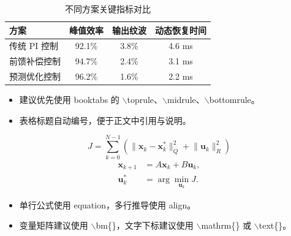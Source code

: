 \documentclass[10pt,aspectratio=169]{beamer}
\begin{document}
\begin{frame}
\begin{HUSTContentFrame}
\begin{HUSTTableBlock}[表格样式示例]
\begin{table}
\centering
\caption{不同方案关键指标对比}
\HUSTLatinFont\HUSTSerifFont\fontsize{22}{29}\selectfont
\begin{tabular}{lccc}
\toprule
方案 & 峰值效率 & 输出纹波 & 动态恢复时间 \\
\midrule
传统 PI 控制 & 92.1\% & 3.8\% & 4.6 ms \\
前馈补偿控制 & 94.7\% & 2.4\% & 3.1 ms \\
预测优化控制 & 96.2\% & 1.6\% & 2.2 ms \\
\bottomrule
\end{tabular}
\end{table}
\end{HUSTTableBlock}
\vspace{.12in}
\begin{itemize}
  \item 建议优先使用 booktabs 的 \(\backslash\)toprule、\(\backslash\)midrule、\(\backslash\)bottomrule。
  \item 表格标题自动编号，便于正文中引用与说明。
\end{itemize}
\end{HUSTContentFrame}
\end{frame}

\begin{frame}
\begin{HUSTContentFrame}
\begin{HUSTEquationBlock}[公式样式示例]
\HUSTLatinFont\HUSTSerifFont\fontsize{22}{30}\selectfont
\begin{equation}
  J = \sum_{k=0}^{N-1}\left(\lVert \bm{x}_k-\bm{x}^{\ast}_k\rVert_Q^2
  + \lVert \bm{u}_k\rVert_R^2\right)
\end{equation}
\begin{align}
  \bm{x}_{k+1} &= A\bm{x}_k + B\bm{u}_k, \\
  \bm{u}^{\ast}_k &= \arg\min_{\bm{u}_k} J .
\end{align}
\end{HUSTEquationBlock}
\vspace{.10in}
\begin{itemize}
  \item 单行公式使用 equation，多行推导使用 align。
  \item 变量矩阵建议使用 \(\backslash\)bm\{\}，文字下标建议使用 \(\backslash\)mathrm\{\} 或 \(\backslash\)text\{\}。
\end{itemize}
\end{HUSTContentFrame}
\end{frame}
\end{document}
